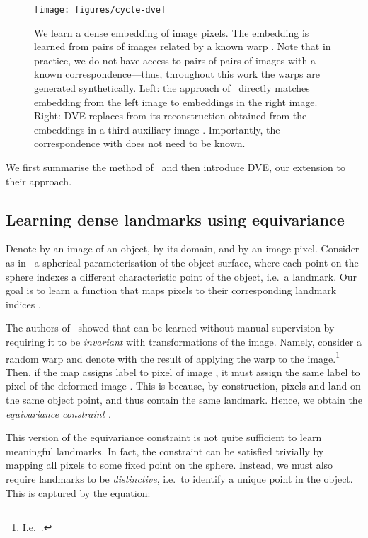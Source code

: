 \documentclass[10pt,twocolumn,letterpaper]{article}
\begin{document}
\begin{figure*}[t]
\vspace*{-0.7cm}\hspace*{0.4cm}\centering\texttt{[image: figures/cycle-dve]}
\caption{We learn a dense embedding  of image pixels.
The embedding is learned from pairs of images  related by a known warp . Note that in practice, we do not have access to pairs of pairs of images with a known correspondence---thus, throughout this work the warps are generated synthetically.
Left: the approach of~\cite{thewlis17Bunsupervised} directly matches embedding  from the left image to embeddings  in the right image.
Right: DVE replaces  from its reconstruction  obtained from the embeddings in a third auxiliary image .
Importantly, the correspondence with  does not need to be known. 
}\label{f:transv}
\end{figure*} 
We first summarise the method of~\cite{thewlis17Bunsupervised} and then introduce DVE, our extension to their approach.

\subsection{Learning dense landmarks using equivariance}\label{s:die}

Denote by  an image of an object, by  its domain, and by  an image pixel.
Consider as in~\cite{thewlis17Bunsupervised} a spherical parameterisation of the object surface, where each point on the sphere indexes a different characteristic point of the object, i.e.~a landmark.
Our goal is to learn a function  that maps pixels  to their corresponding landmark indices .

The authors of~\cite{thewlis17Bunsupervised} showed that  can be learned without manual supervision by requiring it to be \emph{invariant} with transformations of the image.
Namely, consider a random warp  and denote with  the result of applying the warp to the image.\footnote{I.e.~.}
Then, if the map assigns label  to pixel  of image , it must assign the same label  to pixel  of the deformed image .
This is because, by construction, pixels  and  land on the same object point, and thus contain the same landmark.
Hence, we obtain the \emph{equivariance constraint} .

This version of the equivariance constraint is not quite sufficient to learn meaningful landmarks.
In fact, the constraint can be satisfied trivially by mapping all pixels to some fixed point on the sphere.
Instead, we must also require landmarks to be \emph{distinctive}, i.e.~to identify a unique point in the object.
This is captured by the equation:
\end{document}

